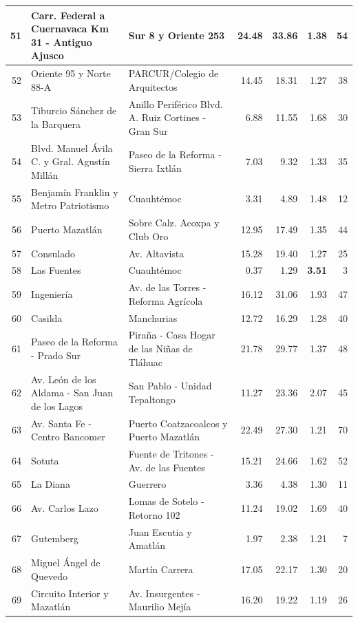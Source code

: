 {\begin{longtable}{|r|p{5.0cm}|p{5.0cm}|r|r|r|r|}
  \hline
  51 & Carr. Federal a Cuernavaca Km 31 - Antiguo Ajusco & Sur 8 y Oriente 253 & 24.48 & 33.86 & 1.38 & 54 \\
  \hline
  52 & Oriente 95 y Norte 88-A & PARCUR/Colegio de Arquitectos & 14.45 & 18.31 & 1.27 & 38 \\
  \hline
  53 & Tiburcio Sánchez de la Barquera & Anillo Periférico Blvd. A. Ruiz Cortines - Gran Sur & 6.88 & 11.55 & 1.68 & 30 \\
  \hline
  54 & Blvd. Manuel Ávila C. y Gral. Agustín Millán & Paseo de la Reforma - Sierra Ixtlán & 7.03 & 9.32 & 1.33 & 35 \\
  \hline
  55 & Benjamín Franklin y Metro Patriotismo & Cuauhtémoc & 3.31 & 4.89 & 1.48 & 12 \\
  \hline
  56 & Puerto Mazatlán & Sobre Calz. Acoxpa y Club Oro & 12.95 & 17.49 & 1.35 & 44 \\
  \hline
  57 & Consulado & Av. Altavista & 15.28 & 19.40 & 1.27 & 25 \\
  \hline
  58 & Las Fuentes & Cuauhtémoc & 0.37 & 1.29 & \textbf{3.51} & 3 \\
  \hline
  59 & Ingeniería & Av. de las Torres - Reforma Agrícola & 16.12 & 31.06 & 1.93 & 47 \\
  \hline
  60 & Casilda & Manchurias & 12.72 & 16.29 & 1.28 & 40 \\
  \hline
  61 & Paseo de la Reforma - Prado Sur & Piraña - Casa Hogar de las Niñas de Tláhuac & 21.78 & 29.77 & 1.37 & 48 \\
  \hline
  62 & Av. León de los Aldama - San Juan de los Lagos & San Pablo - Unidad Tepaltongo & 11.27 & 23.36 & 2.07 & 45 \\
  \hline
  63 & Av. Santa Fe - Centro Bancomer & Puerto Coatzacoalcos y Puerto Mazatlán & 22.49 & 27.30 & 1.21 & 70 \\
  \hline
  64 & Sotuta & Fuente de Tritones - Av. de las Fuentes & 15.21 & 24.66 & 1.62 & 52 \\
  \hline
  65 & La Diana & Guerrero & 3.36 & 4.38 & 1.30 & 11 \\
  \hline
  66 & Av. Carlos Lazo & Lomas de Sotelo - Retorno 102 & 11.24 & 19.02 & 1.69 & 40 \\
  \hline
  67 & Gutemberg & Juan Escutia y Amatlán & 1.97 & 2.38 & 1.21 & 7 \\
  \hline
  68 & Miguel Ángel de Quevedo & Martín Carrera & 17.05 & 22.17 & 1.30 & 20 \\
  \hline
  69 & Circuito Interior y Mazatlán & Av. Insurgentes - Maurilio Mejía & 16.20 & 19.22 & 1.19 & 26 \\

\end{longtable}}
